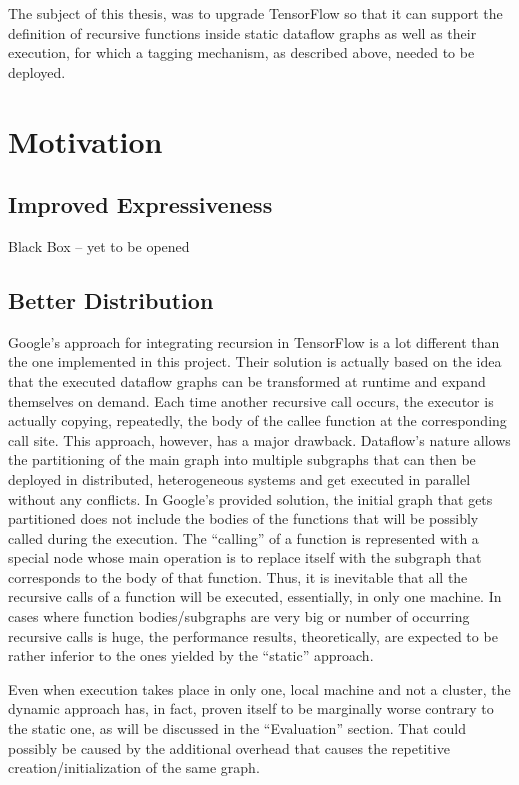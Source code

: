 \documentclass[ack,preface]{dithesis}
\begin{document}
The subject of this thesis, was to upgrade TensorFlow so that it can support the definition of recursive functions inside static dataflow graphs as well as their execution, for which a tagging mechanism, as described above, needed to be deployed.


    \section{Motivation}

    \subsection{Improved Expressiveness}
	Black Box – yet to be opened

    \subsection{Better Distribution}
	Google’s approach for integrating recursion in TensorFlow is a lot different than the one implemented in this project. Their solution is actually based on the idea that the executed dataflow graphs can be transformed at runtime and expand themselves on demand. Each time another recursive call occurs, the executor is actually copying, repeatedly, the body of the callee function at the corresponding call site. This approach, however, has a major drawback. Dataflow’s nature allows the partitioning of the main graph into multiple subgraphs that can then be deployed in distributed, heterogeneous systems and get executed in parallel without any conflicts. In Google’s provided solution, the initial graph that gets partitioned does not include the bodies of the functions that will be possibly called during the execution. The “calling” of a function is represented with a special node whose main operation is to replace itself with the subgraph that corresponds to the body of that function. Thus, it is inevitable that all the recursive calls of a function will be executed, essentially, in only one machine.  In cases where function bodies/subgraphs are very big or number of occurring recursive calls is huge, the performance results, theoretically, are expected to be rather inferior to the ones yielded by the “static” approach.

Even when execution takes place in only one, local machine and not a cluster, the dynamic approach has, in fact, proven itself to be marginally worse contrary to the static one, as will be discussed in the “Evaluation” section. That could possibly be caused by the additional overhead that causes the repetitive creation/initialization of the same graph.
\end{document}
